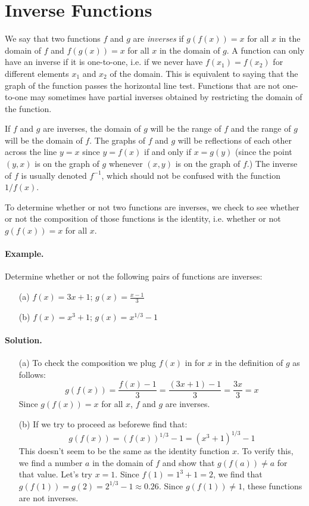\section{Inverse Functions}

We say that two functions $f$ and $g$ are \emph{inverses} if $g(f(x))=x$ for all $x$ in the domain of $f$ and $f(g(x))=x$ for all $x$ in the domain of $g$. A function can only have an inverse if it is one-to-one, i.e. if we never have $f(x_1)=f(x_2)$ for different elements $x_1$ and $x_2$ of the domain. This is equivalent to saying that the graph of the function passes the horizontal line test. Functions that are not one-to-one may sometimes have partial inverses obtained by restricting the domain of the function.

If $f$ and $g$ are inverses, the domain of $g$ will be the range of $f$ and the range of $g$ will be the domain of $f$. The graphs of $f$ and $g$ will be reflections of each other across the line $y=x$ since $y=f(x)$ if and only if $x=g(y)$ (since the point $(y,x)$ is on the graph of $g$ whenever $(x,y)$ is on the graph of $f$.)  The inverse of $f$ is usually denoted $f^{-1}$, which should not be confused with the function $1/f(x)$.

To determine whether or not two functions are inverses, we check to see whether or not the composition of those functions is the identity, i.e. whether or not $g(f(x))=x$ for all $x$. 

\paragraph{Example.} Determine whether or not the following pairs of functions are inverses:
\begin{itemize}
\item[(a)] $f(x)=3x+1$; $\displaystyle g(x)=\frac{x-1}3$
\item [(b)]$f(x)=x^3+1$; $g(x)=x^{1/3}-1$
\end{itemize}

\paragraph{Solution.}
\begin{itemize}
\item [(a)] To check the composition we plug $f(x)$ in for $x$ in the definition of $g$ as follows: \[ g(f(x))=\frac{f(x)-1}3=\frac{(3x+1)-1}3=\frac{3x}3=x\] Since $g(f(x))=x$ for all $x$, $f$ and $g$ are inverses.
\item [(b)] If we try to proceed as beforewe find that: \[ g(f(x))=(f(x))^{1/3}-1 =(x^3+1)^{1/3}-1\] This doesn't seem to be the same as the identity function $x$. To verify this, we find a number $a$ in the domain of $f$ and show that $g(f(a))\neq a$ for that value. Let's try $x=1$. Since $f(1)=1^3+1=2$, we find that $g(f(1))=g(2)=2^{1/3}-1\approx 0.26$. Since $g(f(1))\neq 1$, these functions are not inverses.
\end{itemize}

